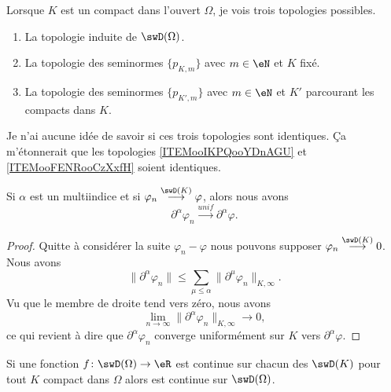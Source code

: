 \begin{probleme}
    Lorsque \( K\) est un compact dans l'ouvert \( \Omega\), je vois trois topologies possibles.
    \begin{enumerate}
        \item
            La topologie induite de \( \swD(\Omega)\).
        \item       \label{ITEMooIKPQooYDnAGU}
            La topologie des seminormes \( \{ p_{K,m} \}\) avec \( m\in \eN\) et \( K\) fixé.
        \item       \label{ITEMooFENRooCzXxfH}
            La topologie des seminormes \( \{ p_{K',m} \}\) avec \( m\in \eN\) et \( K'\) parcourant les compacts dans \( K\).
    \end{enumerate}
    Je n'ai aucune idée de savoir si ces trois topologies sont identiques. Ça m'étonnerait que les topologies \ref{ITEMooIKPQooYDnAGU} et \ref{ITEMooFENRooCzXxfH} soient identiques.
\end{probleme}

\begin{lemma}    \label{LemXXwDjui}
    Si \( \alpha\) est un multiindice et si \( \varphi_n\stackrel{\swD(K)}{\longrightarrow}\varphi\), alors nous avons
    \begin{equation}
        \partial^{\alpha}\varphi_n\stackrel{unif}{\longrightarrow}\partial^{\alpha}\varphi.
    \end{equation}
\end{lemma}

\begin{proof}
    Quitte à considérer la suite \( \varphi_n-\varphi\) nous pouvons supposer \( \varphi_n\stackrel{\swD(K)}{\longrightarrow}0\). Nous avons
    \begin{equation}
        \| \partial^{\alpha}\varphi_n \|\leq \sum_{\mu\leq\alpha}\| \partial^{\mu}\varphi_n \|_{K,\infty}.
    \end{equation}
    Vu que le membre de droite tend vers zéro, nous avons
    \begin{equation}
        \lim_{n\to \infty} \| \partial^{\alpha}\varphi_n \|_{K,\infty}\to 0,
    \end{equation}
    ce qui revient à dire que \( \partial^{\alpha}\varphi_n\) converge uniformément sur \( K\) vers \( \partial^{\alpha}\varphi\).
\end{proof}

\begin{lemma}   \label{LemWEGpemo}
    Si une fonction \( f\colon \swD(\Omega)\to \eR\) est continue sur chacun des \( \swD(K)\) pour tout \( K\) compact dans \( \Omega\) alors est continue sur \( \swD(\Omega)\).
\end{lemma}

